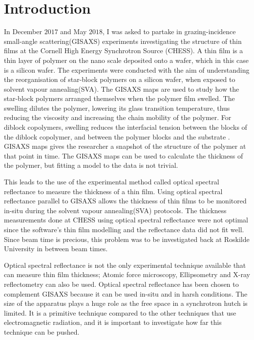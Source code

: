 \documentclass[MasterThesisMain.tex]{subfiles}
\begin{document}
\chapter{Introduction}
	
In December $2017$ and May $2018$, I was asked to partake in grazing-incidence small-angle scattering(GISAXS) experiments investigating the structure of thin films at the Cornell High Energy Synchrotron Source (CHESS). A thin film is a thin layer of polymer on the nano scale deposited onto a wafer, which in this case is a silicon wafer. The experiments were conducted with the aim of understanding the reorganisation of star-block polymers on a silicon wafer, when exposed to solvent vapour annealing(SVA). The GISAXS maps are used to study how the star-block polymers arranged themselves when the polymer film swelled. The swelling dilutes the polymer, lowering its glass transition temperature, thus reducing the viscosity and increasing the chain mobility of the polymer. For diblock copolymers, swelling reduces the interfacial tension between the blocks of the diblock copolymer, and between the polymer blocks and the substrate \cite{posseltintro}. GISAXS maps gives the researcher a snapshot of the structure of the polymer at that point in time. The GISAXS maps can be used to calculate the thickness of the polymer, but fitting a model to the data is not trivial.

This leads to the use of the experimental method called optical spectral reflectance to measure the thickness of a thin film. Using optical spectral reflectance parallel to GISAXS allows the thickness of thin films to be monitored in-situ during the solvent vapour annealing(SVA) protocols. The thickness measurements done at CHESS using optical spectral reflectance were not optimal since the software's thin film modelling and the reflectance data did not fit well. Since beam time is precious, this problem was to be investigated back at Roskilde University in between beam times.

Optical spectral reflectance is not the only experimental technique available that can measure thin film thickness; Atomic force microscopy, Ellipsometry and X-ray reflectometry can also be used. Optical spectral reflectance has been chosen to complement GISAXS because it can be used in-situ and in harsh conditions. The size of the apparatus plays a huge role as the free space in a synchrotron hutch is limited. It is a primitive technique compared to the other techniques that use electromagnetic radiation, and it is important to investigate how far this technique can be pushed.
\end{document}
